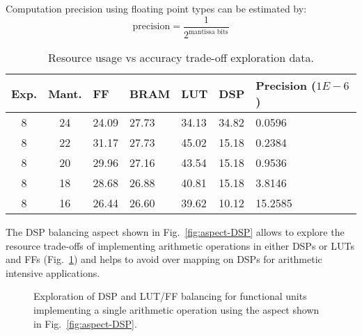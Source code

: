 Computation precision using floating point types can be estimated by:
$$ \text{precision} = \frac{1}{2^{\text{mantissa bits}}} $$

\begin{table}[!ht]
  \begin{tabularx}{\textwidth}{c|c|X|X|X|X|X}
    Exp. & Mant. & FF    & BRAM  & LUT   & DSP   & Precision ($1E-6$) \\
    \hline\hline
    8      & 24    & 24.09 & 27.73 & 34.13 & 34.82 & 0.0596             \\
    8      & 22    & 31.17 & 27.73 & 45.02 & 15.18 & 0.2384             \\
    8      & 20    & 29.96 & 27.16 & 43.54 & 15.18 & 0.9536             \\
    8      & 18    & 28.68 & 26.88 & 40.81 & 15.18 & 3.8146             \\
    8      & 16    & 26.44 & 26.60 & 39.62 & 10.12 & 15.2585            \\
  \end{tabularx}
  \caption{Resource usage vs accuracy trade-off exploration data.}
\end{table}

The DSP balancing aspect shown in Fig.~\ref{fig:aspect-DSP} allows to
explore the resource trade-offs of implementing arithmetic operations
in either DSPs or LUTs and FFs (Fig.~\ref{fig:arith}) and helps to
avoid over mapping on DSPs for arithmetic intensive applications.

\begin{figure}[!h]
  \centering
  \hspace{-2cm}
  \caption{Exploration of DSP and LUT/FF balancing for functional units
    implementing a single arithmetic operation using the aspect shown
    in Fig.~\ref{fig:aspect-DSP}.}
  \label{fig:arith}
\end{figure}


